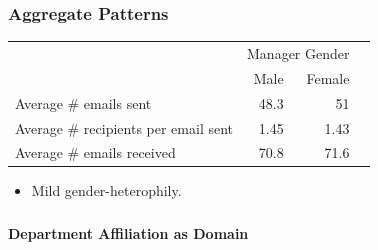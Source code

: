 \documentclass[xcolor={table}]{beamer}
\newenvironment{changemargin}[2]{%
  \begin{list}{}{%
    \setlength{\topsep}{0pt}%
    \setlength{\leftmargin}{#1}%
    \setlength{\rightmargin}{#2}%
    \setlength{\listparindent}{\parindent}%
    \setlength{\itemindent}{\parindent}%
    \setlength{\parsep}{\parskip}%
  }%
  \item[]}{\end{list}}
\begin{document}
\begin{frame}\frametitle{Aggregate Patterns}
	
	\begin{changemargin}{-1cm}{ -1cm}
	\Large
	\centering
    \begin{tabular}{lrrr}
      \toprule
      & \multicolumn{2}{c}{Manager Gender} \\
      \cmidrule{2-3}
      & Male & Female  \\
      \midrule
      Average \# emails sent & 48.3 & 51 \\
      Average \# recipients per email sent & 1.45 & 1.43 \\
      \midrule
      Average \# emails received & 70.8 & 71.6 \\
      \bottomrule
    \end{tabular}
	\end{changemargin} 
	
	\bigskip
	\centering
	\Large
	
	
	\begin{itemize}
		\item Mild gender-heterophily.
	\end{itemize}
	
		
\end{frame}




\begin{frame}\frametitle{}
	\begin{center}
		\Huge\textbf{Department Affiliation as Domain}
	\end{center}
\end{frame}
\end{document}
